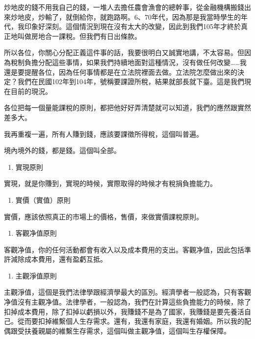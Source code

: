\documentclass[]{ctexbook}
\providecommand{\tightlist}{%
  \setlength{\itemsep}{0pt}\setlength{\parskip}{0pt}}
\begin{document}
炒地皮的錢不用我自己的錢，一堆人去擔任農會漁會的總幹事，從金融機構搬錢出來炒地皮，炒輸了，就倒給你，就跑路啊。6、70年代，因為那是我當時學生的年代，我印象好深刻。這個情況到現在沒有太大的改變，因此到我們105年才終於真正地叫做房地合一課稅。但我們有日出條款。

所以各位，你關心分配正義這件事的話，我要很明白又誠實地講，不太容易。但因為稅制負擔分配這些事情，如果我們持續地面對這種情況，沒有做任何改變\ldots\ldots 我還是要提醒各位，因為任何事情都是在立法院裡面去做。立法院怎麼做出來的決定？我們在民國102年到104年，號稱要課證所稅，結果就部長就下臺。這是我們現在目前的現況。

各位把每一個量能課稅的原則，都把他好好弄清楚就可以知道，我們的應然跟實然差多大。

我再重複一遍，所有人賺到錢，應該要課徵所得稅，這個叫普遍。

境內境外的錢，都是錢。這個叫全部。

\begin{enumerate}
\def\labelenumi{\arabic{enumi}.}
\setcounter{enumi}{2}
\tightlist
\item
  實現原則
\end{enumerate}

實現，就是你賺到，實現的時候，實際取得的時候才有稅捐負擔能力。

\begin{enumerate}
\def\labelenumi{\arabic{enumi}.}
\setcounter{enumi}{3}
\tightlist
\item
  實價（實值）原則
\end{enumerate}

實價，應該依照真正的市場上的價格，售價，來做實價課稅原則。

\begin{enumerate}
\def\labelenumi{\arabic{enumi}.}
\setcounter{enumi}{4}
\tightlist
\item
  客觀净值原則
\end{enumerate}

客觀净值，你的任何活動都會有收入以及成本費用的支出。客觀净值，因此包括準許減除成本費用，還有盈虧互抵。

\begin{enumerate}
\def\labelenumi{\arabic{enumi}.}
\setcounter{enumi}{5}
\tightlist
\item
  主觀淨值原則
\end{enumerate}

主觀淨值，這個是我們法律學跟經濟學最大的區別。經濟學者一般認為，只有客觀净值沒有主觀净值。法律學者，一般認為，我們在計算這些負擔能力的時候，除了扣掉成本費用，除了扣掉以虧損以外，我賺錢不是為了國家，我賺錢是要先養活自己。從而要扣掉維繫個人生存需求。還有，我還有家庭，我還有婚姻。所以我的配偶跟受扶養親屬的維繫生存需求，這個叫做主觀净值，這個叫生存權保障。
\end{document}
